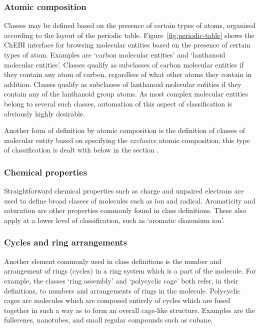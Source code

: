 \documentclass[10pt]{bmc_article}
\newenvironment{bmcformat}{\baselineskip20pt\sloppy\setboolean{publ}{false}}{\baselineskip20pt\sloppy}
\begin{document}
\begin{bmcformat}
\subsubsection*{Atomic composition}

Classes may be defined based on the presence of certain types of atoms, organised according to the layout of the periodic table.  Figure~\ref{fig:periodic-table} shows the ChEBI interface for browsing molecular entities based on the presence of certain types of atom.  Examples are `carbon molecular entities' and `lanthanoid molecular entities'. Classes qualify as subclasses of carbon molecular entities if they contain any atom of carbon, regardless of what other atoms they contain in addition.  Classes qualify as subclasses of lanthanoid molecular entities if they contain any of the lanthanoid group atoms.  As most complex molecular entities belong to several such classes, automation of this aspect of classification is obviously highly desirable. 


Another form of definition by atomic composition is the definition of classes of molecular entity based on specifying the \textit{exclusive} atomic composition; this type of classification is dealt with below in the section \textit{}.


\subsubsection*{Chemical properties}

Straightforward chemical properties such as charge and unpaired electrons are used to define broad classes of molecules such as ion and radical. Aromaticity and saturation are other properties commonly found in class definitions. These also apply at a lower level of classification, such as `aromatic diazonium ion'.  


\subsubsection*{Cycles and ring arrangements}

Another element commonly used in class definitions is the number and arrangement of rings (cycles) in a ring system which is a part of the molecule. For example, the classes `ring assembly' and `polycyclic cage' both refer, in their definitions, to numbers and arrangements of rings in the molecule. Polycyclic cages are molecules which are composed entirely of cycles which are fused together in such a way as to form an overall cage-like structure.  Examples are the fullerenes, nanotubes, and small regular compounds such as cubane. 


\end{bmcformat}
\end{document}

